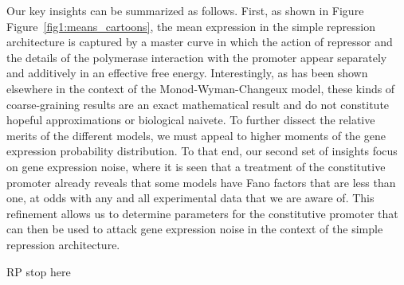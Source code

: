 Our key insights can be summarized as follows.  First, as shown in Figure
Figure~\ref{fig1:means_cartoons}, the mean expression in the
simple repression architecture is captured by a master curve
in which the action of repressor and the details of the polymerase
interaction with the promoter appear separately and additively
in an effective free energy.  Interestingly, as has been shown
elsewhere in the context of the Monod-Wyman-Changeux model,
these kinds of coarse-graining results are an exact mathematical
result and do not constitute hopeful approximations or biological
naivete.  To further dissect the relative merits of the different models,
we must appeal to higher moments of the gene expression probability
distribution.  To that end, our second set of insights focus on gene
expression noise, where it is seen that a treatment of
the constitutive promoter already reveals that some models have Fano
factors that are less than one, at odds with any and all experimental
data that we are aware of.   This refinement allows us to determine
parameters for the constitutive promoter that can then be used
to attack gene expression noise in the context of
the simple repression architecture.

RP stop here





